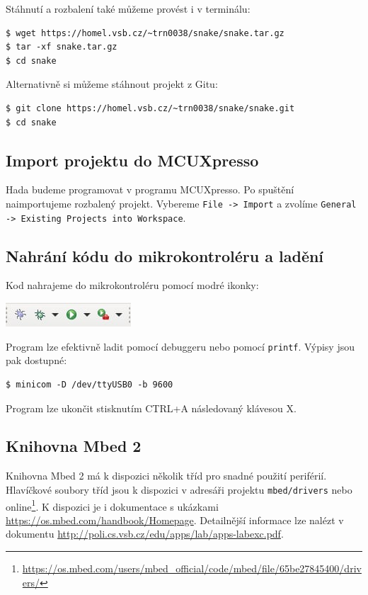 \documentclass[12pt]{article}
\begin{document}
Stáhnutí a rozbalení také můžeme provést i v terminálu:
\begin{verbatim}
$ wget https://homel.vsb.cz/~trn0038/snake/snake.tar.gz
$ tar -xf snake.tar.gz
$ cd snake 
\end{verbatim}

Alternativně si můžeme stáhnout projekt z Gitu:
\begin{verbatim}
$ git clone https://homel.vsb.cz/~trn0038/snake/snake.git
$ cd snake
\end{verbatim}

\subsection{Import projektu do MCUXpresso}
Hada budeme programovat v programu MCUXpresso.
Po spuštění naimportujeme rozbalený projekt.
Vybereme \texttt{File -> Import} a zvolíme \texttt{General -> Existing Projects into Workspace}.

\subsection{Nahrání kódu do mikrokontroléru a ladění}
Kod nahrajeme do mikrokontroléru pomocí modré ikonky:

\begin{center}
\includegraphics{figures/blue-debug.jpg}
\end{center}

Program lze efektivně ladit pomocí debuggeru nebo pomocí \texttt{printf}.
Výpisy jsou pak dostupné:
\begin{verbatim}
$ minicom -D /dev/ttyUSB0 -b 9600
\end{verbatim}
Program lze ukončit stisknutím \textsc{CTRL+A} následovaný klávesou \textsc{X}.

\subsection{Knihovna Mbed 2}
Knihovna Mbed 2 má k dispozici několik tříd pro snadné použití periférií.
Hlavíčkové soubory tříd jsou k dispozici v adresáři projektu \texttt{mbed/drivers} nebo online\footnote{\url{https://os.mbed.com/users/mbed_official/code/mbed/file/65be27845400/drivers/}}.
K dispozici je i dokumentace s ukázkami \url{https://os.mbed.com/handbook/Homepage}.
Detailnější informace lze nalézt v dokumentu \url{http://poli.cs.vsb.cz/edu/apps/lab/apps-labexc.pdf}.
\end{document}

